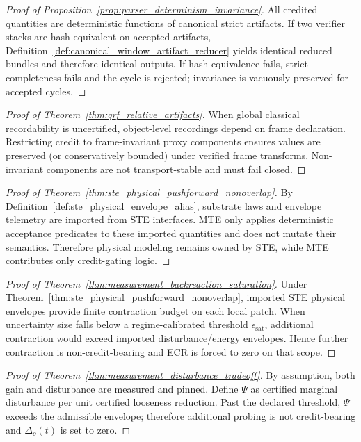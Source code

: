 \documentclass[11pt]{article}
\theoremstyle{definition}
\theoremstyle{plain}
\newcommand{\STE}{\textsf{STE}}
\newcommand{\MTE}{\textsf{MTE}}
\newcommand{\deltao}{\Delta_o}
\newcommand{\epssat}{\epsilon_{\mathrm{sat}}}
\begin{document}
\begin{proof}[Proof of Proposition~\ref{prop:parser_determinism_invariance}]
All credited quantities are deterministic functions of canonical strict artifacts.
If two verifier stacks are hash-equivalent on accepted artifacts, Definition~\ref{def:canonical_window_artifact_reducer} yields identical reduced bundles and therefore identical outputs.
If hash-equivalence fails, strict completeness fails and the cycle is rejected; invariance is vacuously preserved for accepted cycles.
\end{proof}

\begin{proof}[Proof of Theorem~\ref{thm:qrf_relative_artifacts}]
When global classical recordability is uncertified, object-level recordings depend on frame declaration.
Restricting credit to frame-invariant proxy components ensures values are preserved (or conservatively bounded) under verified frame transforms.
Non-invariant components are not transport-stable and must fail closed.
\end{proof}

\begin{proof}[Proof of Theorem~\ref{thm:ste_physical_pushforward_nonoverlap}]
By Definition~\ref{def:ste_physical_envelope_alias}, substrate laws and envelope telemetry are imported from \STE{} interfaces.
\MTE{} only applies deterministic acceptance predicates to these imported quantities and does not mutate their semantics.
Therefore physical modeling remains owned by \STE{}, while \MTE{} contributes only credit-gating logic.
\end{proof}

\begin{proof}[Proof of Theorem~\ref{thm:measurement_backreaction_saturation}]
Under Theorem~\ref{thm:ste_physical_pushforward_nonoverlap}, imported \STE{} physical envelopes provide finite contraction budget on each local patch.
When uncertainty size falls below a regime-calibrated threshold $\epssat$, additional contraction would exceed imported disturbance/energy envelopes.
Hence further contraction is non-credit-bearing and ECR is forced to zero on that scope.
\end{proof}

\begin{proof}[Proof of Theorem~\ref{thm:measurement_disturbance_tradeoff}]
By assumption, both gain and disturbance are measured and pinned.
Define $\Psi$ as certified marginal disturbance per unit certified looseness reduction.
Past the declared threshold, $\Psi$ exceeds the admissible envelope; therefore additional probing is not credit-bearing and $\deltao(t)$ is set to zero.
\end{proof}
\end{document}
